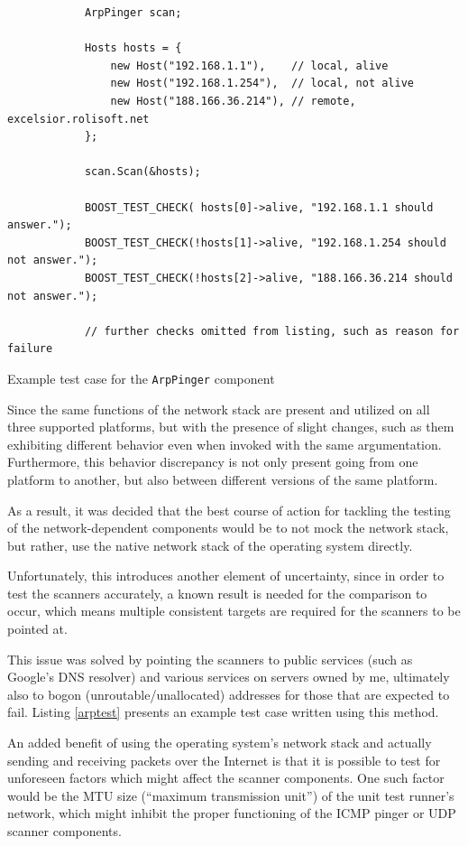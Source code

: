 \documentclass[a4paper,12pt]{article}
\begin{document}
	\begin{listing}[H]
		\begin{verbatim}
			ArpPinger scan;
			
			Hosts hosts = {
				new Host("192.168.1.1"),    // local, alive
				new Host("192.168.1.254"),  // local, not alive
				new Host("188.166.36.214"), // remote, excelsior.rolisoft.net
			};
			
			scan.Scan(&hosts);
			
			BOOST_TEST_CHECK( hosts[0]->alive, "192.168.1.1 should answer.");
			BOOST_TEST_CHECK(!hosts[1]->alive, "192.168.1.254 should not answer.");
			BOOST_TEST_CHECK(!hosts[2]->alive, "188.166.36.214 should not answer.");
			
			// further checks omitted from listing, such as reason for failure
		\end{verbatim}
		\caption{Example test case for the \texttt{ArpPinger} component}
		\label{arptest}
	\end{listing}
	
	Since the same functions of the network stack are present and utilized on all three supported platforms, but with the presence of slight changes, such as them exhibiting different behavior even when invoked with the same argumentation. Furthermore, this behavior discrepancy is not only present going from one platform to another, but also between different versions of the same platform.
	
	As a result, it was decided that the best course of action for tackling the testing of the network-dependent components would be to not mock the network stack, but rather, use the native network stack of the operating system directly. 
	
	Unfortunately, this introduces another element of uncertainty, since in order to test the scanners accurately, a known result is needed for the comparison to occur, which means multiple consistent targets are required for the scanners to be pointed at.
	
	This issue was solved by pointing the scanners to public services (such as Google's DNS resolver) and various services on servers owned by me, ultimately also to bogon (unroutable/unallocated) addresses for those that are expected to fail. Listing \ref{arptest} presents an example test case written using this method.
	
	An added benefit of using the operating system's network stack and actually sending and receiving packets over the Internet is that it is possible to test for unforeseen factors which might affect the scanner components. One such factor would be the MTU size (``maximum transmission unit'') of the unit test runner's network, which might inhibit the proper functioning of the ICMP pinger or UDP scanner components.
	
\end{document}
